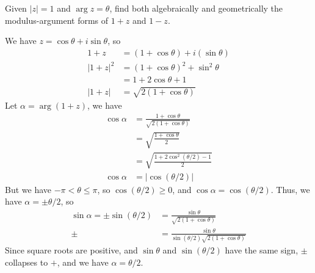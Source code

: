 \documentclass[12pt]{article}
\begin{document}
    \begin{question}
        Given $|z|=1$ and $\arg z = \theta $, find both
        algebraically and geometrically the modulus-argument
        forms of $1+z$ and $1-z$.
    \end{question}
    \begin{answer}
        We have $z = \cos\theta + i\sin\theta$, so
        \begin{align*}
            1+z 
            &= (1+\cos\theta)+i(\sin\theta)\\
            |1+z|^{2} 
            &= (1+\cos\theta)^{2} + \sin^{2}\theta\\
            &= 1+2\cos\theta+1\\
            |1+z|
            &= \sqrt{2(1+\cos\theta)}
        \end{align*}
        Let $\alpha = \arg(1+z)$, we have
        \begin{align*}
            \cos\alpha 
            &= \frac{1+\cos\theta}{\sqrt{2(1+\cos\theta)}}\\
            &= \sqrt{\frac{1+\cos\theta}{2}}\\
            &= \sqrt{\frac{1+2\cos^{2}(\theta/2)-1}{2}}\\
            \cos\alpha 
            &= |\cos(\theta/2)|
        \end{align*}
        But we have $-\pi<\theta\le\pi$, so $\cos(\theta/2) \ge 0$, and $\cos\alpha=\cos(\theta/2)$.
        Thus, we have $\alpha = \pm\theta/2$, so
        \begin{align*}
            \sin\alpha
            = \pm\sin(\theta/2)
            &= \frac{\sin\theta}{\sqrt{2(1+\cos\theta)}}\\
            \pm &= \frac{\sin\theta}{\sin(\theta/2)\sqrt{2(1+\cos\theta)}}
        \end{align*}
        Since square roots are positive, and $\sin\theta$ and $\sin(\theta/2)$ have the
        same sign, $\pm$ collapses to $+$, and we have $\alpha = \theta/2$.


\end{answer}
\end{document}
